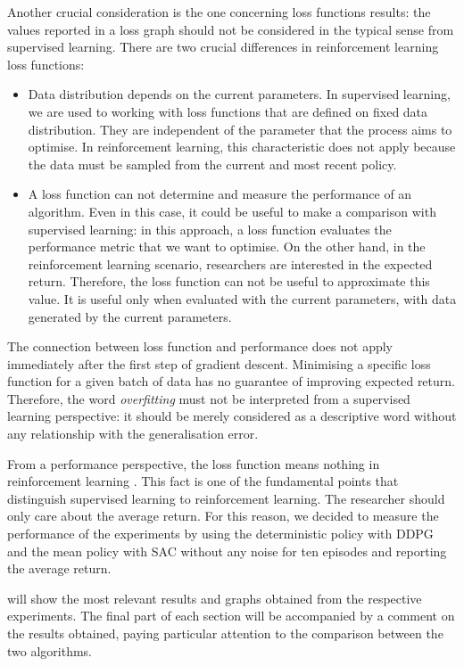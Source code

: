 Another crucial consideration is the one concerning loss functions results: the values reported in a loss graph should not be considered in the typical sense from supervised learning.
There are two crucial differences in reinforcement learning loss functions:

\begin{itemize}
    \item Data distribution depends on the current parameters.
          In supervised learning, we are used to working with loss functions that are defined on fixed data distribution.
          They are independent of the parameter that the process aims to optimise.
          In reinforcement learning, this characteristic does not apply because the data must be sampled from the current and most recent policy.
    \item A loss function can not determine and measure the performance of an algorithm.
          Even in this case, it could be useful to make a comparison with supervised learning: in this approach, a loss function evaluates the performance metric that we want to optimise.
          On the other hand, in the reinforcement learning scenario, researchers are interested in the expected return.
          Therefore, the loss function can not be useful to approximate this value.
          It is useful only when evaluated with the current parameters, with data generated by the current parameters.
\end{itemize}

The connection between loss function and performance does not apply immediately after the first step of gradient descent.
Minimising a specific loss function for a given batch of data has no guarantee of improving expected return.
Therefore, the word \textit{overfitting} must not be interpreted from a supervised learning perspective: it should be merely considered as a descriptive word without any relationship with the generalisation error.

From a performance perspective, the loss function means nothing in reinforcement learning \cite{openai2018spinningup}.
This fact is one of the fundamental points that distinguish supervised learning to reinforcement learning.
The researcher should only care about the average return.
For this reason, we decided to measure the performance of the experiments by using the deterministic policy with DDPG and the mean policy with SAC without any noise for ten episodes and reporting the average return.

 will show the most relevant results and graphs obtained from the respective experiments.
The final part of each section will be accompanied by a comment on the results obtained, paying particular attention to the comparison between the two algorithms.

